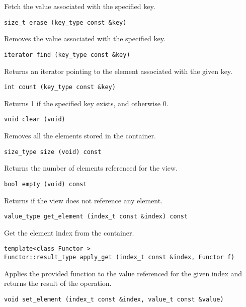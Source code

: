 Fetch the value associated with the specified key.

\begin{verbatim}
size_t erase (key_type const &key)
\end{verbatim}

Removes the value associated with the specified key.

\begin{verbatim}
iterator find (key_type const &key)
\end{verbatim}

Returns an iterator pointing to the element associated with the given key.

\begin{verbatim}
int count (key_type const &key)
\end{verbatim}

Returns 1 if the specified key exists, and otherwise 0.

\begin{verbatim}
void clear (void)
\end{verbatim}

Removes all the elements stored in the container.

\begin{verbatim}
size_type size (void) const
\end{verbatim}

Returns the number of elements referenced for the view.

\begin{verbatim}
bool empty (void) const
\end{verbatim}

Returns if the view does not reference any element.

\begin{verbatim}
value_type get_element (index_t const &index) const
\end{verbatim}

Get the element index from the container.

\begin{verbatim}
template<class Functor >
Functor::result_type apply_get (index_t const &index, Functor f)
\end{verbatim}

Applies the provided function to the value referenced for the given index and returns the result of the operation.

\begin{verbatim}
void set_element (index_t const &index, value_t const &value)
\end{verbatim}

